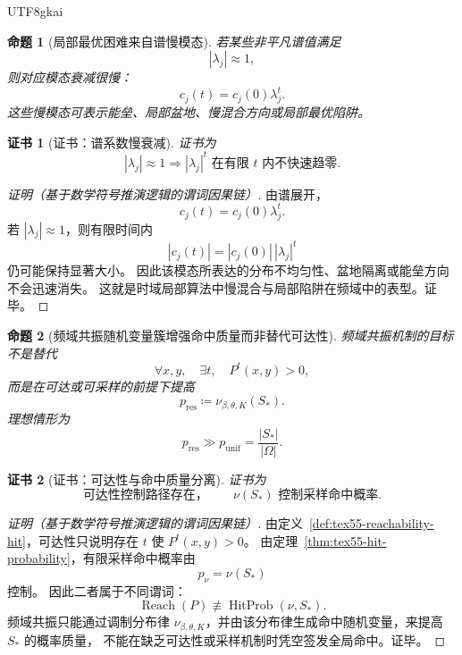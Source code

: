 \documentclass[12pt]{article}
\newtheorem{proposition}{命题}[section]
\newtheorem{Certificate}{证书}[section]
\newcommand{\DefEq}{\coloneqq}
\newcommand{\Unif}{\mathrm{unif}}
\begin{document}
\begin{CJK*}{UTF8}{gkai}
\begin{proposition}[局部最优困难来自谱慢模态]
\label{prop:tex55-slow-mode-trap}
若某些非平凡谱值满足
\[
  |\lambda_j|\approx1,
\]
则对应模态衰减很慢：
\[
  c_j(t)=c_j(0)\lambda_j^t.
\]
这些慢模态可表示能垒、局部盆地、慢混合方向或局部最优陷阱。
\end{proposition}

\begin{Certificate}[证书：谱系数慢衰减]
\label{cert:tex55-slow-mode-trap}
证书为
\[
  |\lambda_j|\approx1
  \Longrightarrow
  |\lambda_j|^t\text{ 在有限 }t\text{ 内不快速趋零}.
\]
\end{Certificate}

\begin{proof}[证明（基于数学符号推演逻辑的谓词因果链）]
由谱展开，
\[
  c_j(t)=c_j(0)\lambda_j^t.
\]
若 \(|\lambda_j|\approx1\)，则有限时间内
\[
  |c_j(t)|=|c_j(0)|\,|\lambda_j|^t
\]
仍可能保持显著大小。
因此该模态所表达的分布不均匀性、盆地隔离或能垒方向不会迅速消失。
这就是时域局部算法中慢混合与局部陷阱在频域中的表型。证毕。
\end{proof}

\begin{proposition}[频域共振随机变量簇增强命中质量而非替代可达性]
\label{prop:tex55-resonance-not-reachability}
频域共振机制的目标不是替代
\[
  \forall x,y,\quad \exists t,\quad P^t(x,y)>0,
\]
而是在可达或可采样的前提下提高
\[
  p_{\mathrm{res}}
  \DefEq
  \nu_{\beta,\theta,K}(S_*).
\]
理想情形为
\[
  p_{\mathrm{res}}
  \gg
  p_{\Unif}
  =
  \frac{|S_*|}{|\Omega|}.
\]
\end{proposition}

\begin{Certificate}[证书：可达性与命中质量分离]
\label{cert:tex55-resonance-not-reachability}
证书为
\[
  \text{可达性控制路径存在，}
  \qquad
  \nu(S_*)\text{ 控制采样命中概率}.
\]
\end{Certificate}

\begin{proof}[证明（基于数学符号推演逻辑的谓词因果链）]
由定义~\ref{def:tex55-reachability-hit}，可达性只说明存在 \(t\) 使 \(P^t(x,y)>0\)。
由定理~\ref{thm:tex55-hit-probability}，有限采样命中概率由
\[
  p_{\nu}=\nu(S_*)
\]
控制。
因此二者属于不同谓词：
\[
  \operatorname{Reach}(P)
  \not\equiv
  \operatorname{HitProb}(\nu,S_*).
\]
频域共振只能通过调制分布律 \(\nu_{\beta,\theta,K}\)，并由该分布律生成命中随机变量，来提高 \(S_*\) 的概率质量，
不能在缺乏可达性或采样机制时凭空签发全局命中。证毕。
\end{proof}


\end{CJK*}
\end{document}
